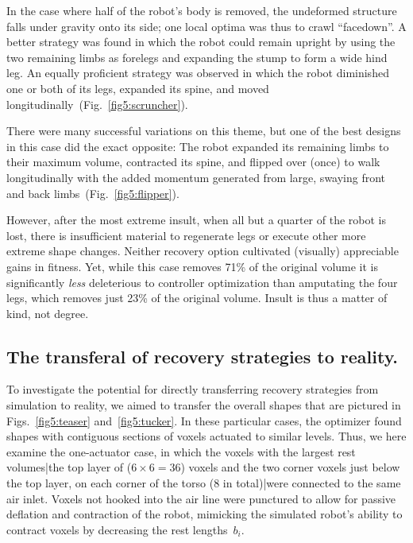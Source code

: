 

In the case where half of the robot's body is removed, the undeformed structure falls under gravity onto its side; one local optima was thus to crawl ``facedown''.
A better strategy was found in which the robot could remain upright by using the two remaining limbs as forelegs and expanding the stump to form a wide hind leg.
An equally proficient strategy was observed in which the robot diminished one or both of its legs, expanded its spine, and moved longitudinally~(Fig.~\ref{fig5:scruncher}).




There were many successful variations on this theme,
but one of the best designs in this case did the exact opposite: The robot expanded its remaining limbs to their maximum volume, contracted its spine, and flipped over (once) to walk longitudinally with the added momentum generated from large, swaying front and back limbs~(Fig.~\ref{fig5:flipper}).




However, after the most extreme insult, when all but a quarter of the robot is lost, there is insufficient material to regenerate legs or execute other more extreme shape changes. 
Neither recovery option cultivated (visually) appreciable gains in fitness.
Yet, while this case removes 71\% of the original volume it is significantly \textit{less} deleterious to controller optimization than amputating the four legs, which removes just 23\% of the original volume.
Insult is thus a matter of kind, not degree.


\subsection*{The transferal of recovery strategies to reality.}


To investigate the potential for directly transferring recovery strategies from simulation to reality, we aimed to transfer the overall shapes that are pictured in Figs.~\ref{fig5:teaser} and~\ref{fig5:tucker}. 
In these particular cases, the optimizer found shapes with contiguous sections of voxels actuated to similar levels. 
Thus, we here examine the one-actuator case, in which the voxels with the largest rest volumes|the top layer of ($6\times6=36$) voxels and the two corner voxels just below the top layer, on each corner of the torso (8 in total)|were connected to the same air inlet. 
Voxels not hooked into the air line were punctured to allow for passive deflation and contraction of the robot, mimicking the simulated robot's ability to contract voxels by decreasing the rest lengths~$b_i$. 



